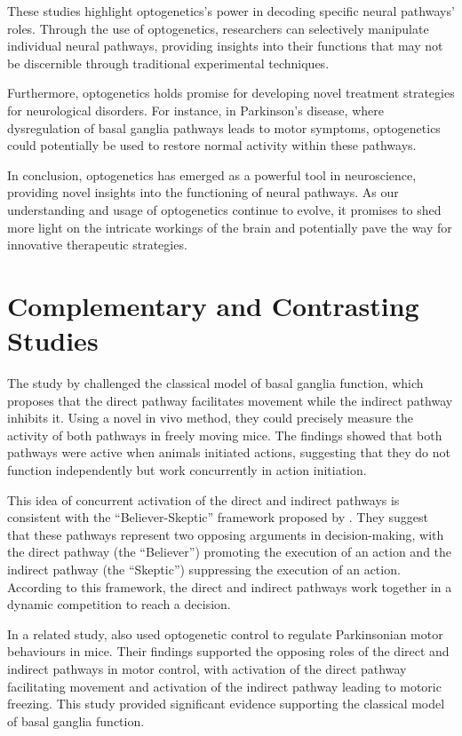 \documentclass[10pt]{article}
\begin{document}
\begin{sloppypar}
  These studies highlight optogenetics’s power in decoding specific neural pathways’ roles. Through the use of optogenetics, researchers can selectively manipulate individual neural pathways, providing insights into their functions that may not be discernible through traditional experimental techniques.

  Furthermore, optogenetics holds promise for developing novel treatment strategies for neurological disorders. For instance, in Parkinson’s disease, where dysregulation of basal ganglia pathways leads to motor symptoms, optogenetics could potentially be used to restore normal activity within these pathways.

  In conclusion, optogenetics has emerged as a powerful tool in neuroscience, providing novel insights into the functioning of neural pathways. As our understanding and usage of optogenetics continue to evolve, it promises to shed more light on the intricate workings of the brain and potentially pave the way for innovative therapeutic strategies.

  \section{Complementary and Contrasting Studies}
  \label{sec:complementary-and-contrasting-studies}
  The study by \cite{cui_concurrent_2013} challenged the classical model of basal ganglia function, which proposes that the direct pathway facilitates movement while the indirect pathway inhibits it. Using a novel in vivo method, they could precisely measure the activity of both pathways in freely moving mice. The findings showed that both pathways were active when animals initiated actions, suggesting that they do not function independently but work concurrently in action initiation.

  This idea of concurrent activation of the direct and indirect pathways is consistent with the “Believer-Skeptic” framework proposed by \cite{dunovan_believer-skeptic_2016}. They suggest that these pathways represent two opposing arguments in decision-making, with the direct pathway (the “Believer”) promoting the execution of an action and the indirect pathway (the “Skeptic”) suppressing the execution of an action. According to this framework, the direct and indirect pathways work together in a dynamic competition to reach a decision.

  In a related study, \cite{kravitz_regulation_2010} also used optogenetic control to regulate Parkinsonian motor behaviours in mice. Their findings supported the opposing roles of the direct and indirect pathways in motor control, with activation of the direct pathway facilitating movement and activation of the indirect pathway leading to motoric freezing. This study provided significant evidence supporting the classical model of basal ganglia function.


\end{sloppypar}
\end{document}
